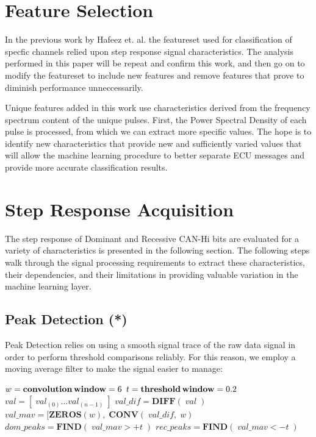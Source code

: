 \documentclass[conference]{IEEEtran}
\begin{document}
\section{Feature Selection}

In the previous work by Hafeez et. al. \cite{hafeez2019} the featureset used for classification of specfic channels relied upon step response signal characteristics. The analysis performed in this paper will be repeat and confirm this work, and then go on to modify the featureset to include new features and remove features that prove to diminish performance unneccessarily.

Unique features added in this work use characteristics derived from the frequency spectrum content of the unique pulses. First, the Power Spectral Density of each pulse is processed, from which we can extract more specific values. The hope is to identify new characteristics that provide new and sufficiently varied values that will allow the machine learning procedure to better separate ECU messages and provide more accurate classification results.



\section{Step Response Acquisition}

The step response of Dominant and Recessive CAN-Hi bits are evaluated for a variety of characteristics is presented in the following section. The following steps walk through the signal processing requirements to extract these characteristics, their dependencies, and their limitations in providing valuable variation in the machine learning layer.

\subsection{Peak Detection (*)}
Peak Detection relies on using a smooth signal trace of the raw data signal in order to perform threshold comparisons reliably. For this reason, we employ a moving average filter to make the signal easier to manage:
\medbreak
\begin{algorithmic}
\STATE $w = \textbf{convolution\,window} = 6$
\STATE $t = \textbf{threshold\,window} = 0.2$
\STATE $val = [\;val_{(0)} ... val_{(n-1)}\;] $
\STATE $val\_dif = \textbf{DIFF}(\;val\;) $
\STATE $val\_mav = [\textbf{ZEROS}(w),\;\textbf{CONV}(\;val\_dif,\;w) $
\STATE $dom\_peaks = \textbf{FIND}(\;val\_mav > +t\;)$
\STATE $rec\_peaks = \textbf{FIND}(\;val\_mav < -t\;)$
\end{algorithmic}
\medbreak
\end{document}
